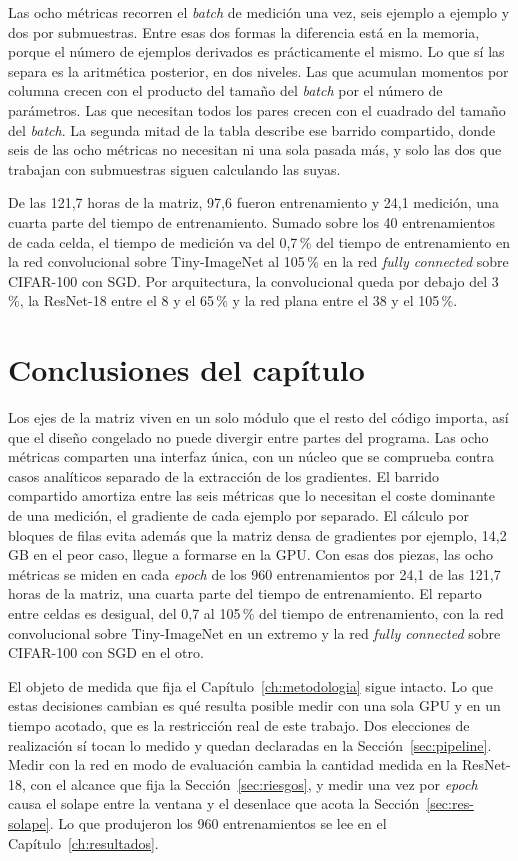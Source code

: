 Las ocho métricas recorren el \emph{batch} de medición una vez, seis ejemplo a ejemplo y dos por submuestras. Entre esas dos formas la diferencia está en la memoria, porque el número de ejemplos derivados es prácticamente el mismo. Lo que sí las separa es la aritmética posterior, en dos niveles. Las que acumulan momentos por columna crecen con el producto del tamaño del \emph{batch} por el número de parámetros. Las que necesitan todos los pares crecen con el cuadrado del tamaño del \emph{batch}. La segunda mitad de la tabla describe ese barrido compartido, donde seis de las ocho métricas no necesitan ni una sola pasada más, y solo las dos que trabajan con submuestras siguen calculando las suyas.

De las 121,7 horas de la matriz, 97,6 fueron entrenamiento y 24,1 medición, una cuarta parte del tiempo de entrenamiento. Sumado sobre los 40 entrenamientos de cada celda, el tiempo de medición va del 0,7\,\% del tiempo de entrenamiento en la red convolucional sobre Tiny-ImageNet al 105\,\% en la red \emph{fully connected} sobre CIFAR-100 con SGD. Por arquitectura, la convolucional queda por debajo del 3\,\%, la ResNet-18 entre el 8 y el 65\,\% y la red plana entre el 38 y el 105\,\%.

\section{Conclusiones del capítulo}
\label{sec:des-conclusiones}

Los ejes de la matriz viven en un solo módulo que el resto del código importa, así que el diseño congelado no puede divergir entre partes del programa. Las ocho métricas comparten una interfaz única, con un núcleo que se comprueba contra casos analíticos separado de la extracción de los gradientes. El barrido compartido amortiza entre las seis métricas que lo necesitan el coste dominante de una medición, el gradiente de cada ejemplo por separado. El cálculo por bloques de filas evita además que la matriz densa de gradientes por ejemplo, 14,2 GB en el peor caso, llegue a formarse en la GPU. Con esas dos piezas, las ocho métricas se miden en cada \emph{epoch} de los 960 entrenamientos por 24,1 de las 121,7 horas de la matriz, una cuarta parte del tiempo de entrenamiento. El reparto entre celdas es desigual, del 0,7 al 105\,\% del tiempo de entrenamiento, con la red convolucional sobre Tiny-ImageNet en un extremo y la red \emph{fully connected} sobre CIFAR-100 con SGD en el otro.

El objeto de medida que fija el Capítulo~\ref{ch:metodologia} sigue intacto. Lo que estas decisiones cambian es qué resulta posible medir con una sola GPU y en un tiempo acotado, que es la restricción real de este trabajo. Dos elecciones de realización sí tocan lo medido y quedan declaradas en la Sección~\ref{sec:pipeline}. Medir con la red en modo de evaluación cambia la cantidad medida en la ResNet-18, con el alcance que fija la Sección~\ref{sec:riesgos}, y medir una vez por \emph{epoch} causa el solape entre la ventana y el desenlace que acota la Sección~\ref{sec:res-solape}. Lo que produjeron los 960 entrenamientos se lee en el Capítulo~\ref{ch:resultados}.
